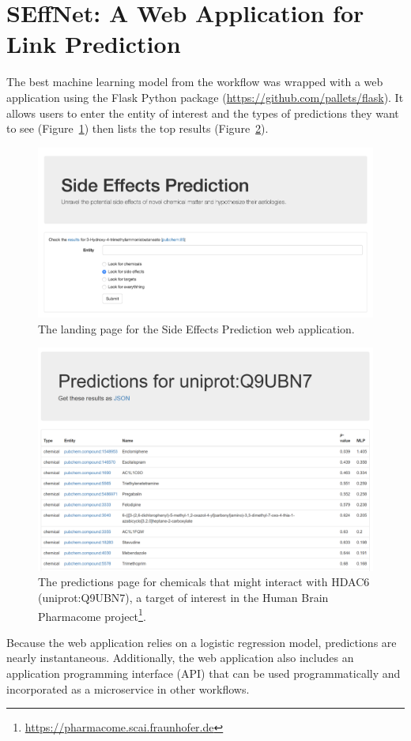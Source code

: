 \section{SEffNet: A Web Application for Link Prediction}

The best machine learning model from the workflow was wrapped with a web application using the Flask Python package (\url{https://github.com/pallets/flask}).
It allows users to enter the entity of interest and the types of predictions they want to see (Figure~\ref{fig:web_page}) then lists the top results (Figure~\ref{fig:protein_prediction}).

\begin{figure}[!h]
    \centering
    \includegraphics[scale=0.35]
    {figures/web_page.png}
    \captionsetup{justification=centering}
    \caption{\label{fig:web_page} The landing page for the Side Effects Prediction web application.}
\end{figure}

\begin{figure}[!h]
    \centering
    \includegraphics[scale=0.5]
    {figures/protein_prediction.png}
    \caption[The predictions page for chemicals interacting with HDAC6]{\label{fig:protein_prediction} The predictions page for chemicals that might interact with HDAC6 (uniprot:Q9UBN7), a target of interest in the Human Brain Pharmacome project\footnote{\url{https://pharmacome.scai.fraunhofer.de}}.}
\end{figure}

Because the web application relies on a logistic regression model, predictions are nearly instantaneous.
Additionally, the web application also includes an application programming interface (API) that can be used programmatically and incorporated as a microservice in other workflows.
